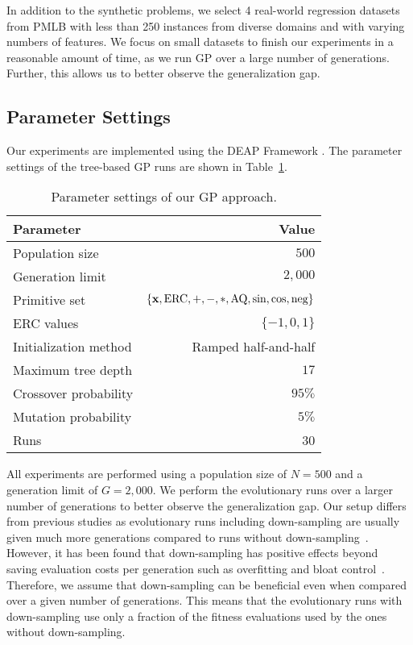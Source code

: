 \documentclass[runningheads]{llncs}
\begin{document}
In addition to the synthetic problems, we select 4 real-world regression datasets from PMLB \cite{Olson2017PMLB} with less than 250 instances from diverse domains and with varying numbers of features. We focus on small datasets to finish our experiments in a reasonable amount of time, as we run GP over a large number of generations. Further, this allows us to better observe the generalization gap.


\subsection{Parameter Settings}
\label{subsec:parameter_settings}

Our experiments are implemented using the DEAP Framework \cite{Fortin.2012}. The parameter settings of the tree-based GP runs are shown in Table~\ref{tab:parameter_setting}.

\begin{table}[h]
  \centering
\caption{Parameter settings of our GP approach.}
\label{tab:parameter_setting}
\begin{tabular}{l|r}
 \toprule 
\textbf{Parameter} & \textbf{Value} \\
\midrule
Population size & $500$ \\
Generation limit & $2,000$ \\
Primitive set & $\{\textrm{\textbf{x}}, \textrm{ERC}, +, -, *, \textrm{AQ}, \textrm{sin}, \textrm{cos}, \textrm{neg}\}$ \\
ERC values & $\{-1,0,1\}$ \\
Initialization method & Ramped half-and-half \\
Maximum tree depth & $17$ \\
Crossover probability & $95\%$ \\
Mutation probability & $5\%$ \\
Runs & 30 \\
\bottomrule
\end{tabular}
\end{table}

All experiments are performed using a population size of $N=500$ and a generation limit of $G=2,000$. We perform the evolutionary runs over a larger number of generations to better observe the generalization gap. Our setup differs from previous studies as evolutionary runs including down-sampling are usually given much more generations compared to runs without down-sampling~\cite{geiger.2023, Hernandez.2019}. However, it has been found that down-sampling has positive effects beyond saving evaluation costs per generation such as overfitting and bloat control~\cite{Goncalves.2012}. Therefore, we assume that down-sampling can be beneficial even when compared over a given number of generations. This means that the evolutionary runs with down-sampling use only a fraction of the fitness evaluations used by the ones without down-sampling. 
\end{document}
